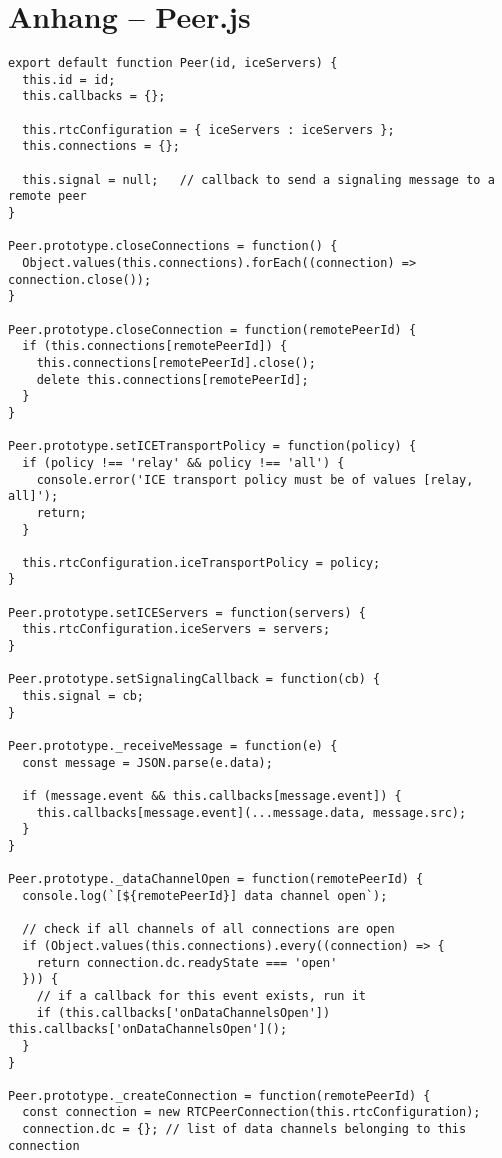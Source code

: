 \appendix
\chapter{Anhang -- Peer.js}
\lstset{language=js, style=STYLE_CODE_JS}
\begin{singlespace}
\begin{lstlisting}[]
export default function Peer(id, iceServers) {
  this.id = id;
  this.callbacks = {};

  this.rtcConfiguration = { iceServers : iceServers };
  this.connections = {};

  this.signal = null;   // callback to send a signaling message to a remote peer
}

Peer.prototype.closeConnections = function() {
  Object.values(this.connections).forEach((connection) => connection.close());
}

Peer.prototype.closeConnection = function(remotePeerId) {
  if (this.connections[remotePeerId]) {
    this.connections[remotePeerId].close();
    delete this.connections[remotePeerId];
  }
}

Peer.prototype.setICETransportPolicy = function(policy) {
  if (policy !== 'relay' && policy !== 'all') {
    console.error('ICE transport policy must be of values [relay, all]');
    return;
  }

  this.rtcConfiguration.iceTransportPolicy = policy;
}

Peer.prototype.setICEServers = function(servers) {
  this.rtcConfiguration.iceServers = servers;
}

Peer.prototype.setSignalingCallback = function(cb) {
  this.signal = cb;
}

Peer.prototype._receiveMessage = function(e) {
  const message = JSON.parse(e.data);

  if (message.event && this.callbacks[message.event]) {
    this.callbacks[message.event](...message.data, message.src);
  }
}

Peer.prototype._dataChannelOpen = function(remotePeerId) {
  console.log(`[${remotePeerId}] data channel open`);

  // check if all channels of all connections are open
  if (Object.values(this.connections).every((connection) => {
    return connection.dc.readyState === 'open'
  })) {
    // if a callback for this event exists, run it
    if (this.callbacks['onDataChannelsOpen']) this.callbacks['onDataChannelsOpen']();
  }
}

Peer.prototype._createConnection = function(remotePeerId) {
  const connection = new RTCPeerConnection(this.rtcConfiguration);
  connection.dc = {}; // list of data channels belonging to this connection


\end{lstlisting}
\end{singlespace}
